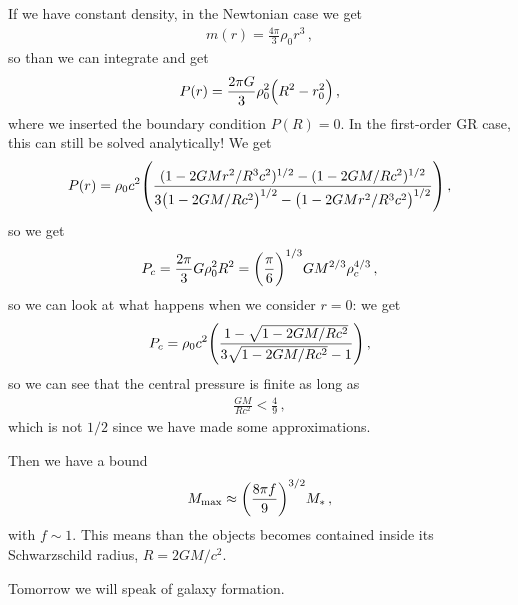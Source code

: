 \documentclass[main.tex]{subfiles}
\begin{document}
If we have constant density, in the Newtonian case we get 
%
\begin{align}
m(r) = \frac{4 \pi }{3} \rho_0 r^3
\,,
\end{align}
%
so than we can integrate and get 
%
\begin{align}
P(r) = \frac{2 \pi G}{3}  \rho_0^2 \qty(R^2 - r_0^2)
\,,
\end{align}
%
where we inserted the boundary condition \(P(R) = 0\). In the first-order GR case, this can still be solved analytically! We get 
%
\begin{align}
P(r) = \rho_0 c^2 \qty(\frac{(1 - 2GM r^2 / R^3 c^2)^{1/2} - (1 - 2GM / Rc^2)^{1/2}}{3 \qty(1 - 2GM / Rc^2)^{1/2} - \qty(1 - 2GM r^2 / R^3c^2)^{1/2}})
\,,
\end{align}
%
so we get 
%
\begin{align}
P_c = \frac{2 \pi }{3} G \rho_0^2R^2 = \qty(\frac{\pi }{6})^{1/3} GM^{2/3} \rho_{c}^{4/3}
\,,
\end{align}
%
so we can look at what happens when we consider \(r=0\): we get 
%
\begin{align}
P_c = \rho_0 c^2 \qty(\frac{1 - \sqrt{1 - 2GM / Rc^2}}{3 \sqrt{1 - 2GM / Rc^2} - 1})
\,,
\end{align}
%
so we can see that the central pressure is finite as long as 
%
\begin{align}
\frac{GM}{Rc^2} < \frac{4}{9}
\,,
\end{align}
%
which is not \(1/2\) since we have made some approximations. 

Then we have a bound 
%
\begin{align}
M _{\text{max}} \approx \qty(\frac{8 \pi f}{9})^{3/2} M_{*}
\,,
\end{align}
%
with \(f \sim 1\). This means than the objects becomes contained inside its Schwarzschild radius, \(R = 2GM/c^2\). 

Tomorrow we will speak of galaxy formation. 
\end{document}
